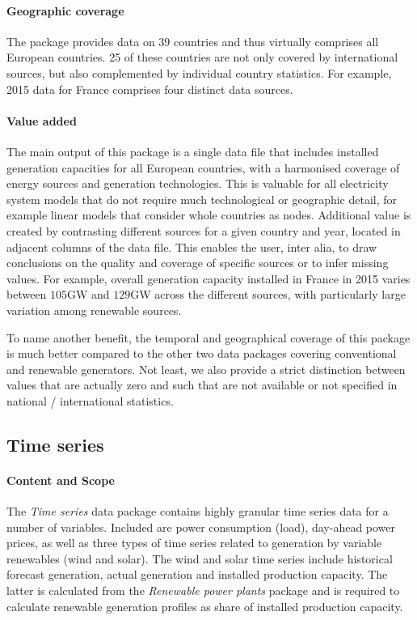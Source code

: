 \documentclass[article,sort&compress]{elsarticle}
\begin{document}
\paragraph{Geographic coverage}
The package provides data on 39 countries and thus virtually comprises all European countries. 25 of these countries are not only covered by international sources, but also complemented by individual country statistics. For example, 2015 data for France comprises four distinct data sources. 

\paragraph{Value added}
The main output of this package is a single data file that includes installed generation capacities for all European countries, with a harmonised coverage of energy sources and generation technologies. This is valuable for all electricity system models that do not require much technological or geographic detail, for example linear models that consider whole countries as nodes. Additional value is created by contrasting different sources for a given country and year, located in adjacent columns of the data file. This enables the user, inter alia, to draw conclusions on the quality and coverage of specific sources or to infer missing values. For example, overall generation capacity installed in France in 2015 varies between $105$GW and $129$GW across the different sources, with particularly large variation among renewable sources.

To name another benefit, the temporal and geographical coverage of this package is much better compared to the other two data packages covering conventional and renewable generators. Not least, we also provide a strict distinction between values that are actually zero and such that are not available or not specified in national / international statistics.


\subsection{Time series}
\label{subsec:time series}

\paragraph{Content and Scope}
The \textit{Time series} data package contains highly granular time series data for a number of variables. Included are power consumption (load), day-ahead power prices, as well as three types of time series related to generation by variable renewables (wind and solar). The wind and solar time series include historical forecast generation, actual generation and installed production capacity. The latter is calculated from the \textit{Renewable power plants} package and is required to calculate renewable generation profiles as share of installed production capacity.
\end{document}
